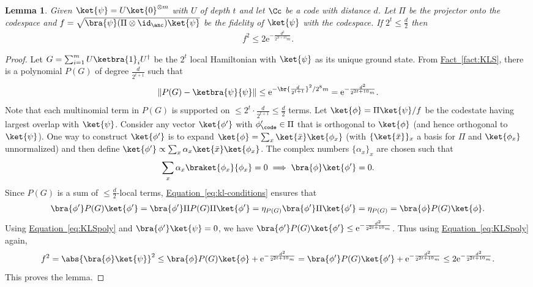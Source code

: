 \documentclass[11pt]{article}
\newcommand{\expref}[2]{\texorpdfstring{\hyperref[#2]{#1~\ref{#2}}}{#1~\ref{#2}}}
\newcommand{\expeqref}[2]{\texorpdfstring{\hyperref[#2]{#1~\eqref{#2}}}{#1~\eqref{#2}}}
\newtheorem{lemma}[theorem]{Lemma}
\newcommand{\eee}{\mathrm e}
\begin{document}
\begin{lemma}
\label{lem:distfidbound}
Given $\ket{\psi}=U\ket{0}^{\otimes m}$ with $U$ of depth $t$ and let $\Cc$ be a code with distance $d$. Let $\Pi$ be the projector onto the codespace and  $f=\sqrt{\bra{\psi}(\Pi\otimes \id_{\anc})\ket{\psi}}$ be the fidelity of $\ket{\psi}$ with the codespace. If $2^t\leq \frac{d}{2}$ then
\begin{align}f^2\leq 2\eee^{-\frac{d^2}{2^{2t+10}m}}.\end{align}
\end{lemma}
\begin{proof}
Let $G= \sum_{i=1}^m U\ketbra{1}_i U^{\dagger}$ be the $2^t$ local Hamiltonian with $\ket{\psi}$ as its unique ground state. From \expref{Fact}{fact:KLS}, there is a polynomial $P(G)$ of degree $\frac{d}{2^{t+1}}$ such that
\begin{equation}
\label{eq:KLSpoly}
\|P(G)-\ketbra{\psi}{\psi}\|\leq \eee^{-\br{\frac{d}{2^{t+1}}}^2/2^8m} = \eee^{-\frac{d^2}{2^{2t+10}m}}.    
\end{equation}
Note that each multinomial term in $P(G)$ is supported on $\leq 2^t\cdot \frac{d}{2^{t+1}} \leq \frac{d}{2}$ terms. Let $\ket{\phi}= \Pi\ket{\psi}/f$ be the codestate having largest overlap with $\ket{\psi}$. Consider any vector $\ket{\phi'}$ with $\phi'_{\code}\in \Pi$ that is orthogonal to $\ket{\phi}$ (and hence orthogonal to $\ket{\psi}$). One way to construct $\ket{\phi'}$ is to expand $\ket{\phi}=\sum_x \ket{\bar{x}}\ket{\phi_x}$ (with $\{\ket{\bar{x}}\}_x$ a basis for $\Pi$ and $\ket{\phi_x}$ unnormalized) and then define $\ket{\phi'}\propto\sum_x \alpha_x\ket{\bar{x}}\ket{\phi_x}$. The complex numbers $\{\alpha_x\}_x$ are chosen such that 
\begin{align}\sum_x \alpha_x \braket{\phi_x}{\phi_x}=0 \implies \bra{\phi}\ket{\phi'}=0.\end{align}
Since $P(G)$ is a sum of $\leq \frac{d}{2}$-local terms, \expeqref{Equation}{eq:kl-conditions} ensures that \begin{align}\bra{\phi'}P(G)\ket{\phi'}=\bra{\phi'}\Pi P(G)\Pi\ket{\phi'}=\eta_{P(G)}\bra{\phi'}\Pi \ket{\phi'}=\eta_{P(G)}=\bra{\phi}P(G)\ket{\phi}.
\end{align}
Using \expeqref{Equation}{eq:KLSpoly} and $\bra{\phi'}\ket{\psi}=0$, we have $\bra{\phi'}P(G)\ket{\phi'} \leq \eee^{-\frac{d^2}{2^{2t+10}m}}$. Thus using \expeqref{Equation}{eq:KLSpoly} again, 
\begin{equation}
\label{eq:fidupbd}
    f^2=\abs{\bra{\phi}\ket{\psi}}^2 \leq \bra{\phi}P(G)\ket{\phi} + \eee^{-\frac{d^2}{2^{2t+10}m}}=\bra{\phi'}P(G)\ket{\phi'} + \eee^{-\frac{d^2}{2^{2t+10}m}}\leq 2\eee^{-\frac{d^2}{2^{2t+10}m}}.
\end{equation}
This proves the lemma.
\end{proof}
\end{document}
